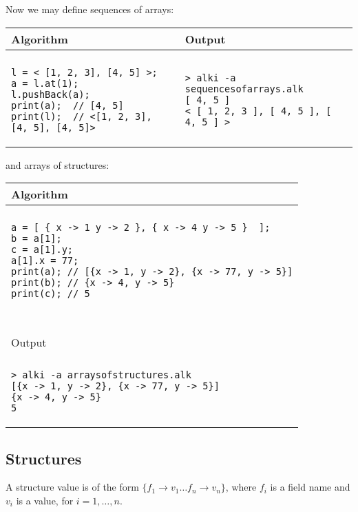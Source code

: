 \documentclass[a4paper]{report}
\begin{document}
Now we may define sequences of arrays:
\begin{center}
\begin{tabular}{ll}
Algorithm & Output\\
\hline
\\
\begin{minipage}{.55\textwidth}
\begin{verbatim}
l = < [1, 2, 3], [4, 5] >;
a = l.at(1);
l.pushBack(a);
print(a);  // [4, 5]
print(l);  // <[1, 2, 3], [4, 5], [4, 5]>
\end{verbatim}
\end{minipage}
&
\begin{minipage}{.45\textwidth}
\begin{verbatim}
> alki -a sequencesofarrays.alk
[ 4, 5 ]
< [ 1, 2, 3 ], [ 4, 5 ], [ 4, 5 ] >
\end{verbatim}
\end{minipage}
\end{tabular}
\end{center}
and arrays of structures:
\begin{center}
\begin{tabular}{l}
Algorithm \\
\hline
\\
\begin{minipage}{.8\textwidth}
\begin{verbatim}
a = [ { x -> 1 y -> 2 }, { x -> 4 y -> 5 }  ]; 
b = a[1];
c = a[1].y;
a[1].x = 77;
print(a); // [{x -> 1, y -> 2}, {x -> 77, y -> 5}]
print(b); // {x -> 4, y -> 5}
print(c); // 5
\end{verbatim}
\end{minipage}
\\
~\\
Output \\
\hline
\\
\begin{minipage}{.8\textwidth}
\begin{verbatim}
> alki -a arraysofstructures.alk 
[{x -> 1, y -> 2}, {x -> 77, y -> 5}]
{x -> 4, y -> 5}
5
\end{verbatim}
\end{minipage}
\end{tabular}
\end{center}

\subsection{Structures}

A structure value is of the form $\{ f_1\to v_1\ldots f_n\to v_n\}$, where $f_i$ is a field name and $v_i$ is a value, for $i=1,\ldots,n$.
\end{document}
